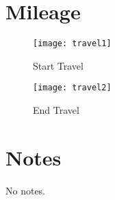 \clearpage
\section{Mileage}
\begin{multicols}{2}
\begin{figure}[H]
	\centering
	\caption{Start Travel}
	\texttt{[image: travel1]}
\end{figure}
\columnbreak
\begin{figure}[H]
	\centering
	\caption{End Travel}
	\texttt{[image: travel2]}
\end{figure}
\end{multicols}

\section{Notes}
\begin{itemize*}
	\item No notes.
\end{itemize*}


